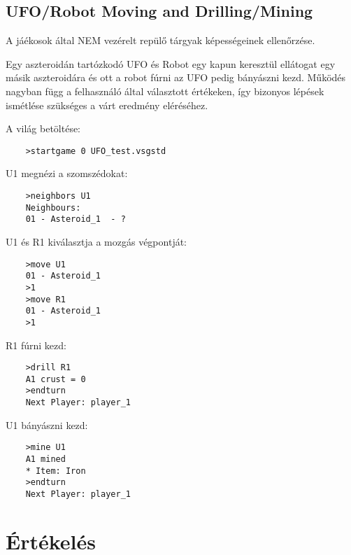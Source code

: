 \documentclass[../../projlab]{subfiles}
\begin{document}
\subsection{UFO/Robot Moving and Drilling/Mining}
\begin{test-case-description}
    A jáékosok által NEM vezérelt repülő tárgyak képességeinek ellenőrzése.
\end{test-case-description}
\begin{test-case-function}
    Egy aszteroidán tartózkodó UFO és Robot egy kapun keresztül ellátogat egy másik aszteroidára és ott a robot fúrni az UFO pedig bányászni kezd. \newline
    Működés nagyban függ a felhasználó által választott értékeken, így bizonyos lépések ismétlése szükséges a várt eredmény eléréséhez.
\end{test-case-function}
\begin{test-case-input}

    A világ betöltése: 
    \begin{verbatim}
    >startgame 0 UFO_test.vsgstd
    \end{verbatim}
    U1 megnézi a szomszédokat:
    \begin{verbatim}
    >neighbors U1
    Neighbours:
    01 - Asteroid_1  - ?
    \end{verbatim}
    U1 és R1 kiválasztja a mozgás végpontját:
    \begin{verbatim}
    >move U1
    01 - Asteroid_1
    >1
    >move R1
    01 - Asteroid_1
    >1
    \end{verbatim}
    R1 fúrni kezd:
    \begin{verbatim}
    >drill R1
    A1 crust = 0
    >endturn
    Next Player: player_1
    \end{verbatim}
    U1 bányászni kezd:
    \begin{verbatim}
    >mine U1
    A1 mined
    * Item: Iron
    >endturn
    Next Player: player_1
    \end{verbatim}
\end{test-case-input}
\begin{test-case-output}

\end{test-case-output}


\section{Értékelés}
\begin{ertekeles}
\end{ertekeles}
\end{document}
